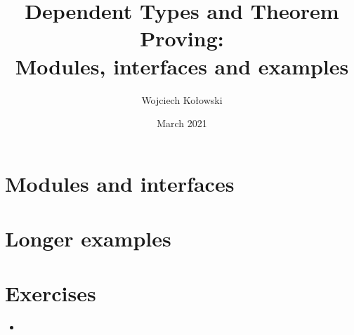 \documentclass{beamer}
\title{Dependent Types and Theorem Proving: \\Modules, interfaces and examples}
\author{Wojciech Kołowski}
\date{March 2021}
\begin{document}
\frame{\titlepage}
\frame{\tableofcontents}

\section{Modules and interfaces}



\section{Longer examples}

\section{Exercises}

\begin{frame}{}
\begin{itemize}
	\item 
\end{itemize}
\end{frame}
\end{document}
